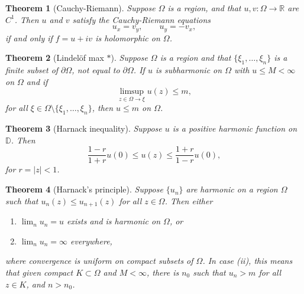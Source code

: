 \documentclass[12pt]{article}
\newtheorem{sats}{Theorem}
\theoremstyle{definition}
\newcommand{\D}{\mathbb{D}}      %
\newcommand{\real}{\mathbb{R}}   %
\begin{document}
\begin{sats}[Cauchy-Riemann]
    Suppose $\Omega$ is a region, and that $u,v:\Omega\to\real$ are $C^1$. Then $u$ and $v$ satisfy the Cauchy-Riemann equations 
    \begin{equation*}
        u_x=v_y,\qquad u_y=-v_x,
    \end{equation*}
    if and only if $f=u+iv$ is holomorphic on $\Omega$.
\end{sats}

\begin{sats}[Lindelöf max $*$]
    Suppose $\Omega$ is a region and that $\{\xi_1,\dots,\xi_n\}$ is a finite subset of $\partial\Omega$, not equal to $\partial\Omega$. If $u$ is subharmonic on $\Omega$ with $u\leq M<\infty$ on $\Omega$ and if 
    \begin{equation*}
        \limsup_{z\in\Omega\to\xi} u(z) \leq m,
    \end{equation*}
    for all $\xi\in\Omega\setminus\{\xi_1,\dots,\xi_n\}$, then $u\leq m$ on $\Omega$.
\end{sats}

\begin{sats}[Harnack inequality]
    Suppose $u$ is a positive harmonic function on $\D$. Then
    \begin{equation*}
        \frac{1-r}{1+r}u(0)\leq u(z)\leq \frac{1+r}{1-r}u(0),
    \end{equation*}   
    for $r=|z|<1$.
\end{sats}

\begin{sats}[Harnack's principle]
    Suppose $\{u_n\}$ are harmonic on a region $\Omega$ such that $u_n(z)\leq u_{n+1}(z)$ for all $z\in\Omega$. Then either
    \begin{enumerate}[label=(\roman*)]
        \item $\lim_n u_n = u$ exists and is harmonic on $\Omega$, or
        \item $\lim_n u_n = \infty$ everywhere,
    \end{enumerate}
    where convergence is uniform on compact subsets of $\Omega$. In case (ii), this means that given compact $K\subset \Omega$ and $M<\infty$, there is $n_0$ such that $u_n>m$ for all $z\in K$, and $n>n_0$.
\end{sats}
\end{document}
